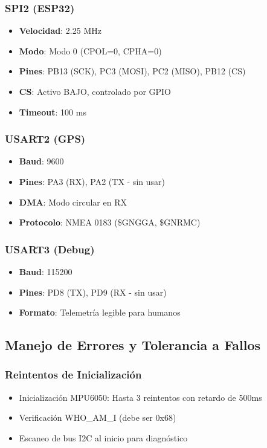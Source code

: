 \documentclass[11pt,a4paper]{article}
\begin{document}
\subsubsection{SPI2 (ESP32)}
\begin{itemize}
    \item \textbf{Velocidad}: 2.25 MHz
    \item \textbf{Modo}: Modo 0 (CPOL=0, CPHA=0)
    \item \textbf{Pines}: PB13 (SCK), PC3 (MOSI), PC2 (MISO), PB12 (CS)
    \item \textbf{CS}: Activo BAJO, controlado por GPIO
    \item \textbf{Timeout}: 100 ms
\end{itemize}

\subsubsection{USART2 (GPS)}
\begin{itemize}
    \item \textbf{Baud}: 9600
    \item \textbf{Pines}: PA3 (RX), PA2 (TX - sin usar)
    \item \textbf{DMA}: Modo circular en RX
    \item \textbf{Protocolo}: NMEA 0183 (\$GNGGA, \$GNRMC)
\end{itemize}

\subsubsection{USART3 (Debug)}
\begin{itemize}
    \item \textbf{Baud}: 115200
    \item \textbf{Pines}: PD8 (TX), PD9 (RX - sin usar)
    \item \textbf{Formato}: Telemetría legible para humanos
\end{itemize}

\subsection{Manejo de Errores y Tolerancia a Fallos}

\subsubsection{Reintentos de Inicialización}
\begin{itemize}
    \item Inicialización MPU6050: Hasta 3 reintentos con retardo de 500ms
    \item Verificación WHO\_AM\_I (debe ser 0x68)
    \item Escaneo de bus I2C al inicio para diagnóstico
\end{itemize}
\end{document}
